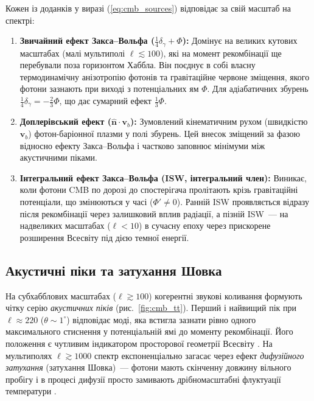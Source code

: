 \documentclass[12pt, a4paper]{article}
\begin{document}
Кожен із доданків у виразі (\ref{eq:cmb_sources}) відповідає за свій масштаб на спектрі:
\begin{enumerate}
  \item \textbf{Звичайний ефект Закса--Вольфа ($\frac{1}{4}\delta_\gamma + \Phi$):} Домінує на великих кутових масштабах (малі мультиполі $\ell \lesssim 100$), які на момент рекомбінації ще перебували поза горизонтом Хаббла. Він поєднує в собі власну термодинамічну анізотропію фотонів та гравітаційне червоне зміщення, якого фотони зазнають при виході з потенціальних ям $\Phi$. Для адіабатичних збурень $\frac{1}{4}\delta_\gamma = -\frac{2}{3}\Phi$, що дає сумарний ефект $\frac{1}{3}\Phi$.
  \item \textbf{Доплерівський ефект ($\hat{\mathbf{n}} \cdot \mathbf{v}_b$):} Зумовлений кінематичним рухом (швидкістю $\mathbf{v}_b$) фотон-баріонної плазми у полі збурень. Цей внесок зміщений за фазою відносно ефекту Закса--Вольфа і частково заповнює мінімуми між акустичними піками.
  \item \textbf{Інтегральний ефект Закса--Вольфа (ISW, інтегральний член):} Виникає, коли фотони CMB по дорозі до спостерігача пролітають крізь гравітаційні потенціали, що змінюються у часі ($\Phi' \neq 0$). Ранній ISW проявляється відразу після рекомбінації через залишковий вплив радіації, а пізній ISW~--- на надвеликих масштабах ($\ell < 10$) в сучасну епоху через прискорене розширення Всесвіту під дією темної енергії.
\end{enumerate}

\subsection{Акустичні піки та затухання Шовка}

На субхабблових масштабах ($\ell \gtrsim 100$) когерентні звукові коливання формують чітку серію \emph{акустичних піків} (рис.~\ref{fig:cmb_tt}). Перший і найвищий пік при $\ell \approx 220$ ($\theta \sim 1^\circ$) відповідає моді, яка встигла зазнати рівно одного максимального стиснення у потенціальній ямі до моменту рекомбінації. Його положення є чутливим індикатором просторової геометрії Всесвіту \cite{planck_2018}. На мультиполях $\ell \gtrsim 1000$ спектр експоненціально загасає через ефект \emph{дифузійного затухання} (затухання Шовка)~--- фотони мають скінченну довжину вільного пробігу і в процесі дифузії просто замивають дрібномасштабні флуктуації температури \cite{silk_1968}.
\end{document}
